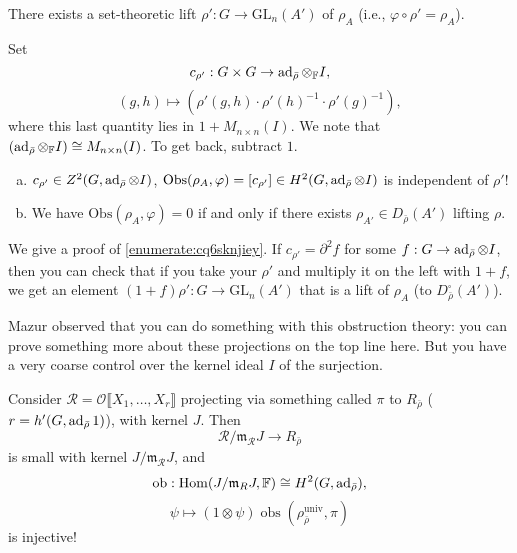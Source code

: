 \documentclass[reqno]{amsart} 
\begin{document}
\begin{fact}
  There exists a set-theoretic lift $\rho ' : G \rightarrow \mathrm{GL}_n(A')$ of $\rho_A$ (i.e., $\varphi \circ \rho ' = \rho_A$).
\end{fact}
\begin{definition}
  Set
  \begin{equation*}
    c_{\rho '} : G \times G \rightarrow \operatorname{ad}_{\bar{\rho}} \otimes_{\mathbb{F}} I,
  \end{equation*}
  \begin{equation*}
    (g, h) \mapsto(\rho '(g, h) \cdot \rho '(h)^{-1} \cdot \rho '(g)^{-1}),
  \end{equation*}
  where this last quantity lies in $1 + M_{n \times n}(I)$.  We note that $(\operatorname{ad}_{\bar{\rho}} \otimes_{\mathbb{F}} I) \cong M_{n \times n}(I)$.  To get back, subtract $1$.
\end{definition}
\begin{proposition}
  \begin{enumerate}[(a)]
  \item\label{enumerate:cq6sknji3b} $c_{\rho '} \in Z^2(G, \operatorname{ad}_{\bar{\rho}} \otimes I)$, $\mathrm{Obs}(\rho_A, \varphi) =[ c_{\rho '} ] \in H^2(G, \operatorname{ad}_{\bar{\rho}} \otimes I)$ is independent of $\rho '$!
  \item\label{enumerate:cq6sknjiey} We have $\mathrm{Obs}(\rho_A, \varphi) = 0$ if and only if there exists $\rho_{A'} \in D_{\bar{\rho}}(A')$ lifting $\rho$.
  \end{enumerate}
\end{proposition}
We give a proof of \eqref{enumerate:cq6sknjiey}.  If $c_{\rho '} = \partial^2 f$ for some $f : G \rightarrow \operatorname{ad}_{\bar{\rho}} \otimes I$, then you can check that if you take your $\rho '$ and multiply it on the left with $1 + f$, we get an element $(1 + f) \rho ' : G \rightarrow \mathrm{GL}_n(A')$ that is a lift of $\rho_A$ (to $D_{\bar{\rho}}^{\square}(A')$).

Mazur observed that you can do something with this obstruction theory: you can prove something more about these projections on the top line here.  But you have a very coarse control over the kernel ideal $I$ of the surjection.
\begin{theorem}
  Consider $\mathcal{R}  = \mathcal{O} \llbracket  X_1, \dotsc, X_r \rrbracket$ projecting via something called $\pi$ to $R_{\bar{\rho}}$ ($r = h'(G, \operatorname{ad}_{\bar{\rho}} 1)$), with kernel $J$.  Then
  \begin{equation*}
    \mathcal{R} / \mathfrak{m}_{\mathcal{R}} J \rightarrow R_{\bar{\rho}}
  \end{equation*}
  is small with kernel $J / \mathfrak{m}_{\mathcal{R}} J$, and
  \begin{equation*}
    \mathrm{o b} : \operatorname{Hom}(J / \mathfrak{m}_R J, \mathbb{F}) \cong H^2(G, \operatorname{ad}_{\bar{\rho}}),
  \end{equation*}
  \begin{equation*}
    \psi \mapsto(1 \otimes \psi) \operatorname{o b s} \left( \rho_{\bar{\rho}}^{\mathrm{univ}}, \pi \right)
  \end{equation*}
  is injective!
\end{theorem}
\end{document}
